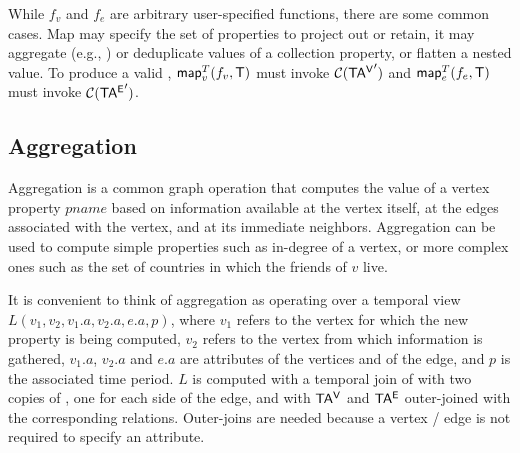 
While $f_v$ and $f_e$ are arbitrary user-specified functions, there
are some common cases.  Map may specify the set of properties to
project out or retain, it may aggregate (e.g., ) or
deduplicate values of a collection property, or flatten a nested
value.
%
To produce a valid \tg, $\textsf{map}^T_v(f_v, \mathsf{T})$ must invoke $\mathcal{C}(\mathsf{TA^{V}}')$
and $\textsf{map}^T_e(f_e, \mathsf{T})$ must invoke $\mathcal{C}(\mathsf{TA^{E}}')$.





\subsection{Aggregation}
\label{sec:algebra:agg}

Aggregation is a common graph operation that computes the value of a
vertex property $pname$ based on information available at the vertex
itself, at the edges associated with the vertex, and at its immediate
neighbors.  Aggregation can be used to compute simple properties such
as in-degree of a vertex, or more complex ones such as the set of
countries in which the friends of $v$ live.

It is convenient to think of aggregation as operating over a temporal
view $L(v_1,v_2,v_1.a,v_2.a,e.a,p)$, where $v_1$ refers to the vertex
for which the new property is being computed, $v_2$ refers to the
vertex from which information is gathered, $v_1.a$, $v_2.a$ and $e.a$
are attributes of the vertices and of the edge, and $p$ is the
associated time period.  $L$ is computed with a temporal join of \te
with two copies of \tv, one for each side of the edge, and with $\mathsf{TA^{V}}$
and $\mathsf{TA^{E}}$ outer-joined with the corresponding relations.  Outer-joins
are needed because a vertex / edge is not required to specify an
attribute.

